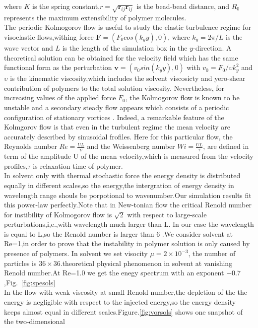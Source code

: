 \documentclass[aps,prl,twocolumn,showpacs,superscriptaddress,groupedaddress]{revtex4}  %
\begin{document}
where $K$ is the spring constant,$r=\sqrt{\mathbf{r}_{ij}\mathbf{r}_{ij}}$ is the bead-bead
distance, and $R_0$ represents the maximum extensibility of polymer molecules.\\
The periodic Kolmogorov flow is useful to study the elastic turbulence regime for visoelastic flows,withing force $\mathbf{F}=(F_0cos(k_yy),0)$,
where $k_y= 2\pi/L$ is the wave vector and $L$ is the length of the simulation box in the $y$-direction. A theoretical solution can be obtained for the 
velocity field which has the same functional form as the perturbation $\mathbf{v}=(v_0sin(k_yy),0)$
with $ v_0=F_0/\upsilon k_{y}^{2}$ and $\upsilon$ is the kinematic viscosity,which includes the solvent viscosicty and yero-shear contribution of polymers to the total solution viscosity. Nevertheless, for increasing values of the applied force $F_0$,
the Kolmogorov flow is known to be unstable and a secondary steady flow appears which consists of a periodic configuration of stationary vortices \cite{posch97}.
Indeed, a remarkable feature of the Kolmgorov flow is that even in the turbulent regime the mean velocity are accurately described by sinusoidal frofiles\cite{boffetta05}.
Here for this particular flow, the Reynolds number $Re=\frac{UL}{\upsilon}$ and the Weissenberg number $Wi=\frac{UL}{\tau}$, are defined in term of the amplitude U of the mean velocity,which is 
measured from the velocity profiles,$\tau$ is relaxation time of polymer.\\
In solvent only with thermal stochastic force the energy density is distributed equally in different scales,so the energy,the intergration of energy density in wavelength range
shouls be porpotional to wavenumber.Our simulation results fit this power-law perfectly.Note that in New-tonian flow the critical Renold number for instibility of Kolmogorov flow is $\sqrt{2}$ with respect to large-scale perturbations,i,e.,with wavelength much larger than L.
In our case the wavelength is equal to L,so the Renold number is larger than $6$ \cite{posch97}.We consider solvent at Re=1,in order to prove that the instability in polymer solution is 
only caused by presence of polymers. In solvent we set visocity $\mu = 2\times10^{-3}$, the number of particles is $36\times36$.theoretical physical phenomenon in solvent at vanishing Renold number.At Re=1.0
we get the enegy spectrum with an exponent $-0.7$,Fig.~\ref{fig:spesols}\\In the flow with weak viscosity at small Renold number,the depletion of the the energy is negligible 
with respect to the injected energy,so the  energy density keeps almost equal in different scales.Figure.\ref{fig:vorsols} shows one snapshot of the two-dimensional 
\end{document}

